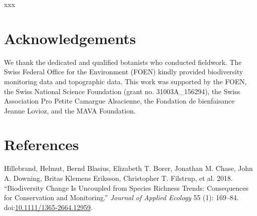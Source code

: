 \documentclass[fleqn,10pt,lineno]{wlpeerj} %
\theoremstyle{definition}
\theoremstyle{definition}
\theoremstyle{definition}
\theoremstyle{remark}
\begin{document}
xxx

\section*{Acknowledgements}\label{acknowledgements}

We thank the dedicated and qualified botanists who conducted fieldwork.
The Swiss Federal Office for the Environment (FOEN) kindly provided
biodiversity monitoring data and topographic data. This work was
supported by the FOEN, the Swiss National Science Foundation (grant no.
31003A\_156294), the Swiss Association Pro Petite Camargue Alsacienne,
the Fondation de bienfaisance Jeanne Lovioz, and the MAVA Foundation.

\section*{References}\label{references}

\hypertarget{refs}{}
\hypertarget{ref-Hillebrand2018}{}
Hillebrand, Helmut, Bernd Blasius, Elizabeth T. Borer, Jonathan M.
Chase, John A. Downing, Britas Klemens Eriksson, Christopher T.
Filstrup, et al. 2018. ``Biodiversity Change Is Uncoupled from Species
Richness Trends: Consequences for Conservation and Monitoring.''
\emph{Journal of Applied Ecology} 55 (1): 169--84.
doi:\href{https://doi.org/10.1111/1365-2664.12959}{10.1111/1365-2664.12959}.
\end{document}
